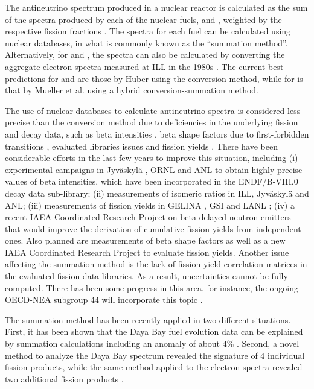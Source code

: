 \documentclass[letterpaper]{ar-1col}
\begin{document}
The antineutrino spectrum produced in a nuclear reactor is calculated as the sum of the spectra produced by each of the nuclear fuels,  and , weighted by the respective fission fractions \cite{Vog81}.
  The spectra for each fuel can be calculated using nuclear databases, in what is commonly known as the \enquote{summation method}.
  Alternatively, for  and , the spectra can also be calculated by converting the aggregate electron spectra measured at ILL in the 1980s \cite{Fei82,Sch85,Hah89}.
  The current best predictions for   and  are those by Huber \cite{Hub11} using the conversion method, while for  is that by Mueller et al. \cite{Mue11} using a hybrid conversion-summation method.

The use of nuclear databases to calculate antineutrino spectra is considered less precise than the conversion method due to deficiencies in the underlying fission and decay data, such as beta intensities \cite{Fal12}, beta shape factors due to first-forbidden transitions \cite{Hay14}, evaluated libraries issues \cite{Son15} and fission yields \cite{Son16}.
  There have been considerable efforts in the last few years to improve this situation, including (i) experimental campaigns in Jyv\"{a}skyl\"{a} \cite{Alg10}, ORNL \cite{Ras16} and ANL \cite{MccTBD} to obtain highly precise values of beta intensities, which have been incorporated in the ENDF/B-VIII.0 decay data sub-library; (ii) measurements of isomeric ratios in ILL, Jyv\"{a}skyl\"{a} and ANL; (iii) measurements of fission yields in GELINA \cite{Viv00}, GSI \cite{Pel17} and LANL \cite{Duk16}; (iv) a recent IAEA Coordinated Research Project on beta-delayed neutron emitters \cite{DimXX} that would improve the derivation of cumulative fission yields from independent ones.
  Also planned are measurements of beta shape factors as well as a new IAEA Coordinated Research Project to evaluate fission yields.
Another issue affecting the summation method is the lack of fission yield correlation matrices in the evaluated fission data libraries.
  As a result, uncertainties cannot be fully computed.
 There has been some progress in this area, for instance, the ongoing OECD-NEA subgroup 44 will incorporate this topic \cite{SobXX}.

The summation method has been recently applied in two different situations.
  First, it has been shown that the Daya Bay fuel evolution data \cite{An17} can be explained by summation calculations including an anomaly of about 4\% \cite{Hay18}.
  Second, a novel method to analyze the Daya Bay spectrum revealed the signature of 4 individual fission products, while the same method applied to the electron spectra revealed two additional fission products \cite{Son18}.
  
\end{document}
